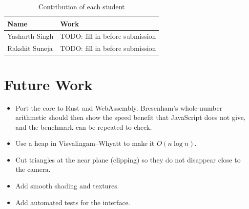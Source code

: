 \begin{table}[H]
\centering
\caption{Contribution of each student}
\label{tab:contrib}
\small
\begin{tabularx}{\linewidth}{@{}p{3.2cm}L@{}}
\toprule
Name & Work\\
\midrule
Yasharth Singh & TODO: fill in before submission\\
Rakshit Suneja & TODO: fill in before submission\\
\bottomrule
\end{tabularx}
\end{table}

\section{Future Work}
\begin{itemize}
\item Port the core to Rust and WebAssembly. Bresenham's whole-number arithmetic should then show the speed benefit that JavaScript does not give, and the benchmark can be repeated to check.
\item Use a heap in Visvalingam--Whyatt to make it $O(n\log n)$.
\item Cut triangles at the near plane (clipping) so they do not disappear close to the camera.
\item Add smooth shading and textures.
\item Add automated tests for the interface.
\end{itemize}
